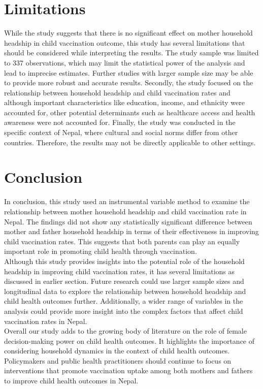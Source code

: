 \documentclass[12pt]{article}
\begin{document}
\section{Limitations}
While the study suggests that there is no significant effect on mother household headship in child vaccination outcome, this study has several limitations that should be considered while interpreting the results. The study sample was limited to 337 observations, which may limit the statistical power of the analysis and lead to imprecise estimates. Further studies with larger sample size may be able to provide more robust and accurate results. Secondly, the study focused on the relationship between household headship and child vaccination rates and although important characteristics like education, income, and ethnicity were accounted for, other potential determinants such as healthcare access and health awareness were not accounted for. Finally, the study was conducted in the specific context of Nepal, where cultural and social norms differ from other countries. Therefore, the results may not be directly applicable to other settings.


\section{Conclusion}
In conclusion, this study used an instrumental variable method to examine the relationship between mother household headship and child vaccination rate in Nepal. The findings did not show any statistically significant difference between mother and father household headship in terms of their effectiveness in improving child vaccination rates. This suggests that both parents can play an equally important role in promoting child health through vaccination.\\

Although this study provides insights into the potential role of the household headship in improving child vaccination rates, it has several limitations as discussed in earlier section. Future research could use larger sample sizes and longitudinal data to explore the relationship between household headship and child health outcomes further. Additionally, a wider range of variables in the analysis could provide more insight into the complex factors that affect child vaccination rates in Nepal.\\

Overall our study adds to the growing body of literature on the role of female decision-making power on child health outcomes.  It highlights the importance of considering household dynamics in the context of child health outcomes. Policymakers and public health practitioners should continue to focus on interventions that promote vaccination uptake among both mothers and fathers to improve child health outcomes in Nepal.\\
\end{document}
